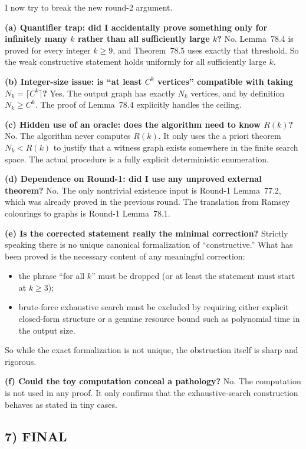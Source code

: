 I now try to break the new round-2 argument.

\medskip
\noindent\textbf{(a) Quantifier trap: did I accidentally prove something only for infinitely many $k$ rather than all sufficiently large $k$?}
No. Lemma~78.4 is proved for every integer $k\ge 9$, and Theorem~78.5 uses exactly that threshold.
So the weak constructive statement holds uniformly for all sufficiently large $k$.

\medskip
\noindent\textbf{(b) Integer-size issue: is ``at least $C^k$ vertices'' compatible with taking $N_k=\lceil C^k\rceil$?}
Yes. The output graph has exactly $N_k$ vertices, and by definition $N_k\ge C^k$.
The proof of Lemma~78.4 explicitly handles the ceiling.

\medskip
\noindent\textbf{(c) Hidden use of an oracle: does the algorithm need to know $R(k)$?}
No. The algorithm never computes $R(k)$.
It only uses the a priori theorem $N_k<R(k)$ to justify that a witness graph exists somewhere in the finite search space.
The actual procedure is a fully explicit deterministic enumeration.

\medskip
\noindent\textbf{(d) Dependence on Round-1: did I use any unproved external theorem?}
No. The only nontrivial existence input is Round-1 Lemma~77.2, which was already proved in the previous round. The translation from Ramsey colourings to graphs is Round-1 Lemma~78.1.

\medskip
\noindent\textbf{(e) Is the corrected statement really the minimal correction?}
Strictly speaking there is no unique canonical formalization of ``constructive.'' What has been proved is the necessary content of any meaningful correction:
\begin{itemize}
\item the phrase ``for all $k$'' must be dropped (or at least the statement must start at $k\ge 3$);
\item brute-force exhaustive search must be excluded by requiring either explicit closed-form structure or a genuine resource bound such as polynomial time in the output size.
\end{itemize}
So while the exact formalization is not unique, the obstruction itself is sharp and rigorous.

\medskip
\noindent\textbf{(f) Could the toy computation conceal a pathology?}
No. The computation is not used in any proof. It only confirms that the exhaustive-search construction behaves as stated in tiny cases.

\subsection*{7) FINAL}

